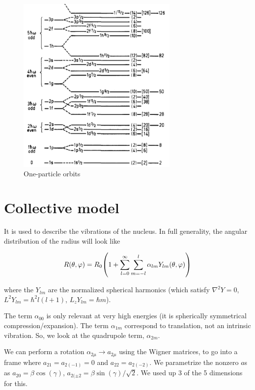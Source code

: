 \documentclass[main.tex]{subfiles}
\begin{document}
\begin{figure}[H]
    \centering
    \includegraphics[width=0.7\textwidth]{figures/nuclear_shells.png}
    \caption{One-particle orbits}
    \label{fig:shell-orbits}
\end{figure}

\section{Collective model}

It is used to describe the vibrations of the nucleus.
In full generality, the angular distribution of the radius will look like

\begin{equation}
    R (\theta, \varphi) = R_0 \qty(1 + \sum _{l=0}   ^{\infty} \sum _{m=-l}   ^{l} \alpha_{lm} Y_{lm} (\theta, \varphi))
\end{equation}

where the \(Y_{lm}\) are the normalized spherical harmonics (which satisfy \(\nabla^2 Y = 0\), \(L^2 Y_{lm} = \hbar^2 l (l+1)\), \(L_z Y_{lm} = \hbar m\)).

The term \(\alpha_{00}\) is only relevant at very high energies (it is spherically symmetrical compression/expansion). The term \(\alpha_{1m}\) correspond to translation, not an intrinsic vibration. So, we look at the quadrupole term, \(\alpha_{2m}\).

We can perform a rotation \(\alpha_{2 \mu} \rightarrow a _{2 \mu} \) using the Wigner matrices, to go into a frame where \(a_{21} = a_{2(-1)} = 0\) and \(a_{22} = a_{2(-2)}\). We parametrize the nonzero \(a\)s as \(a_{20} = \beta \cos(\gamma) \), \(a_{2(\pm 2} = \beta \sin(\gamma) / \sqrt{2}\). We used up 3 of the 5 dimensions for this.
\end{document}
